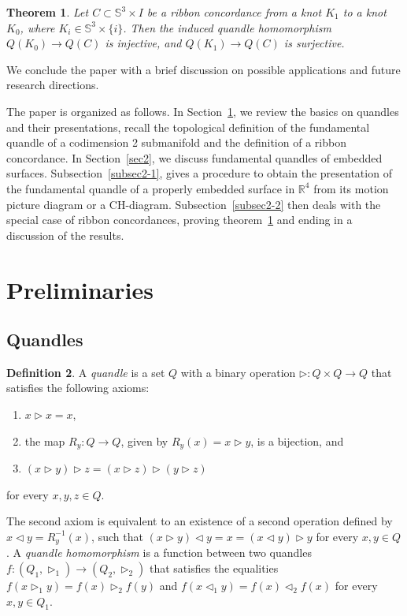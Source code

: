 \documentclass[a4paper,12pt]{amsart}
\numberwithin{equation}{section}
\theoremstyle{plain}
\newtheorem{theorem}{Theorem}[section]
\theoremstyle{definition}
\newtheorem{definition}[theorem]{Definition}
\newcommand{\s}{\mathbb{S}}
\newcommand{\RR}{\mathbb{R}}
\newcommand{\tr}{\triangleright}
\newcommand{\tl}{\triangleleft}
\begin{document}
\begin{theorem}
	\label{thm:ribbon_conc_quandle}
	Let $C\subset \s ^{3}\times I$ be a ribbon concordance from a knot $K_1$ to a knot $K_0$, where $K_{i}\in \s ^{3}\times \{i\}$. 
	Then the induced quandle homomorphism $Q(K_{0})\to Q(C)$ is injective, and $Q(K_{1})\to Q(C)$ is surjective.
\end{theorem}
We conclude the paper with a brief discussion on possible applications and future research directions.



The paper is organized as follows. 
In Section~\ref{sec1}, we review the basics on quandles and their presentations, recall the topological definition of the fundamental quandle of a codimension 2 submanifold and the definition of a ribbon concordance. 
In Section~\ref{sec2}, we discuss fundamental quandles of embedded surfaces. 
Subsection~\ref{subsec2-1}, gives a procedure to obtain the presentation of the fundamental quandle of a properly embedded surface in $\RR ^{4}$ from its motion picture diagram or a CH-diagram.
Subsection~\ref{subsec2-2} then deals with the special case of ribbon concordances, proving theorem~\ref{thm:ribbon_conc_quandle} and ending in a discussion of the results.


























\section{Preliminaries}
\label{sec1}


\subsection{Quandles}
\begin{definition}
	A \textit{quandle} is a set $Q$ with a binary operation $\tr \colon Q\times Q\to Q$ that satisfies the following axioms: 
	\begin{enumerate}
		\item $x\tr x=x$,
		\item the map $R_{y}\colon Q\to Q$, given by $R_{y}(x)=x\tr y$, is a bijection, and
		\item $(x\tr y)\tr z=(x\tr z)\tr (y\tr z)$
	\end{enumerate} for every $x,y,z\in Q$. 
\end{definition}
The second axiom is equivalent to an existence of a second operation defined by $x\tl y=R_{y}^{-1}(x)$, 
such that $(x\tr y)\tl y=x=(x\tl y)\tr y$ for every $x,y\in Q$. 
A \textit{quandle homomorphism} is a function between two quandles $f\colon (Q_{1},\tr _{1})\to (Q_{2},\tr _{2})$ that satisfies the equalities 
$f(x\tr _{1}y)=f(x)\tr _{2}f(y)$ and $f(x \tl_1 y) = f(x) \tl_2 f(x)$ for every $x,y\in Q_1$.
\end{document}
